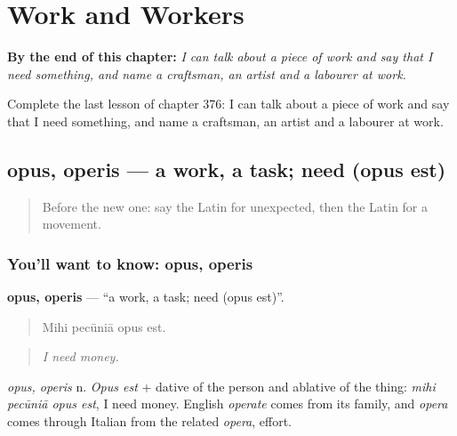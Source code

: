 
\chapter{Work and Workers}
\label{ch:la-work-and-workers}

\begin{chapteropening}
\textbf{By the end of this chapter:} \emph{I can talk about a piece of work and say that I need something, and name a craftsman, an artist and a labourer at work.}

Complete the last lesson of chapter 376: I can talk about a piece of work and say that I need something, and name a craftsman, an artist and a labourer at work.
\end{chapteropening}

\section[opus, operis]{opus, operis — a work, a task; need (opus est)}

\label{lesson:LA-C376-opus}



\begin{quote}
Before the new one: say the Latin for unexpected, then the Latin for a movement.
\end{quote}

\subsection*{You'll want to know: opus, operis}
\textbf{opus, operis} — \textquotedblleft{}a work, a task; need (opus est)\textquotedblright{}.

\begin{quote}
Mihi pecūniā opus est.
\end{quote}

\begin{quote}
\emph{I need money.}
\end{quote}

\emph{opus, operis} n. \emph{Opus est} + dative of the person and ablative of the thing: \emph{mihi pecūniā opus est}, I need money. English \emph{operate} comes from its family, and \emph{opera} comes through Italian from the related \emph{opera}, effort.

